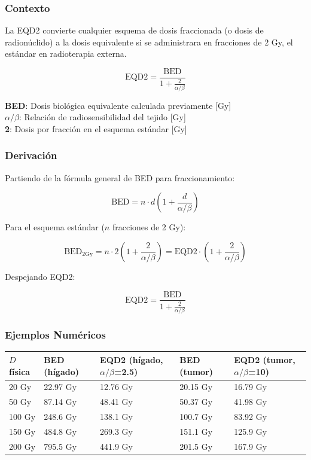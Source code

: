 \documentclass[12pt,a4paper]{article}
\newcommand{\vardef}[2]{\noindent\textbf{#1}: #2\\}
\begin{document}
\subsubsection{Contexto}

La EQD2 convierte cualquier esquema de dosis fraccionada (o dosis de radionúclido) a la dosis equivalente si se administrara en fracciones de 2 Gy, el estándar en radioterapia externa.

$$\text{EQD2} = \frac{\text{BED}}{1 + \frac{2}{\alpha/\beta}}$$

\vardef{BED}{Dosis biológica equivalente calculada previamente [Gy]}
\vardef{$\alpha/\beta$}{Relación de radiosensibilidad del tejido [Gy]}
\vardef{2}{Dosis por fracción en el esquema estándar [Gy]}

\subsubsection{Derivación}

Partiendo de la fórmula general de BED para fraccionamiento:

$$\text{BED} = n \cdot d \left(1 + \frac{d}{\alpha/\beta}\right)$$

Para el esquema estándar ($n$ fracciones de 2 Gy):

$$\text{BED}_{2\text{Gy}} = n \cdot 2 \left(1 + \frac{2}{\alpha/\beta}\right) = \text{EQD2} \cdot \left(1 + \frac{2}{\alpha/\beta}\right)$$

Despejando EQD2:

$$\text{EQD2} = \frac{\text{BED}}{1 + \frac{2}{\alpha/\beta}}$$

\subsubsection{Ejemplos Numéricos}

\begin{tabular}{p{2cm} p{3cm} p{3cm} p{3cm} p{3cm}}
\toprule
\textbf{$D$ física} & \textbf{BED (hígado)} & \textbf{EQD2 (hígado, $\alpha/\beta$=2.5)} & \textbf{BED (tumor)} & \textbf{EQD2 (tumor, $\alpha/\beta$=10)} \\
\midrule
20 Gy & 22.97 Gy & 12.76 Gy & 20.15 Gy & 16.79 Gy \\
50 Gy & 87.14 Gy & 48.41 Gy & 50.37 Gy & 41.98 Gy \\
100 Gy & 248.6 Gy & 138.1 Gy & 100.7 Gy & 83.92 Gy \\
150 Gy & 484.8 Gy & 269.3 Gy & 151.1 Gy & 125.9 Gy \\
200 Gy & 795.5 Gy & 441.9 Gy & 201.5 Gy & 167.9 Gy \\
\bottomrule
\end{tabular}
\end{document}

